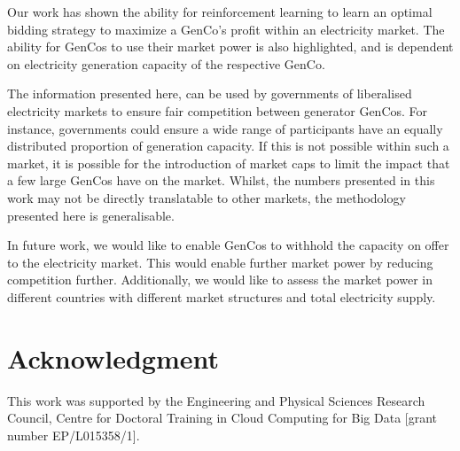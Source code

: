 \documentclass[conference]{IEEEtran}
\begin{document}

Our work has shown the ability for reinforcement learning to learn an optimal bidding strategy to maximize a GenCo's profit within an electricity market. The ability for GenCos to use their market power is also highlighted, and is dependent on electricity generation capacity of the respective GenCo.



The information presented here, can be used by governments of liberalised electricity markets to ensure fair competition between generator GenCos. For instance, governments could ensure a wide range of participants have an equally distributed proportion of generation capacity. If this is not possible within such a market, it is possible for the introduction of market caps to limit the impact that a few large GenCos have on the market. Whilst, the numbers presented in this work may not be directly translatable to other markets, the methodology presented here is generalisable.


In future work, we would like to enable GenCos to withhold the capacity on offer to the electricity market. This would enable further market power by reducing competition further.  Additionally, we would like to assess the market power in different countries with different market structures and total electricity supply.



\section{Acknowledgment}

This work was supported by the Engineering and Physical Sciences Research Council, Centre for Doctoral Training in Cloud Computing for Big Data [grant number EP/L015358/1].





\end{document}
